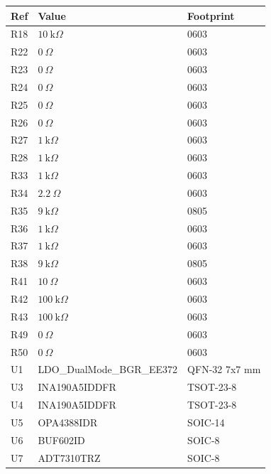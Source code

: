 \documentclass[10pt,letterpaper]{article}
\begin{document}
\begin{tabular}[t]{@{}lll@{}}\toprule Ref & Value & Footprint\\\midrule
R18 & $10\:\text{k}\Omega$ & 0603\\
R22 & $0\:\Omega$ & 0603\\
R23 & $0\:\Omega$ & 0603\\
R24 & $0\:\Omega$ & 0603\\
R25 & $0\:\Omega$ & 0603\\
R26 & $0\:\Omega$ & 0603\\
R27 & $1\:\text{k}\Omega$ & 0603\\
R28 & $1\:\text{k}\Omega$ & 0603\\
R33 & $1\:\text{k}\Omega$ & 0603\\
R34 & $2.2\:\Omega$ & 0603\\
R35 & $9\:\text{k}\Omega$ & 0805\\
R36 & $1\:\text{k}\Omega$ & 0603\\
R37 & $1\:\text{k}\Omega$ & 0603\\
R38 & $9\:\text{k}\Omega$ & 0805\\
R41 & $10\:\Omega$ & 0603\\
R42 & $100\:\text{k}\Omega$ & 0603\\
R43 & $100\:\text{k}\Omega$ & 0603\\
R49 & $0\:\Omega$ & 0603\\
R50 & $0\:\Omega$ & 0603\\
U1 & LDO\_DualMode\_BGR\_EE372 & QFN-32 7x7 mm\\
U3 & INA190A5IDDFR & TSOT-23-8\\
U4 & INA190A5IDDFR & TSOT-23-8\\
U5 & OPA4388IDR & SOIC-14\\
U6 & BUF602ID & SOIC-8\\
U7 & ADT7310TRZ & SOIC-8\\
\bottomrule\end{tabular}
\newpage
\end{document}
